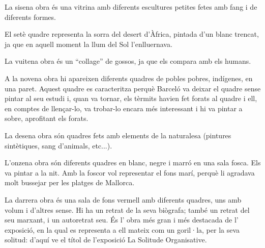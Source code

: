 \begin{news}
La sisena obra és una vitrina amb diferents escultures petites fetes amb fang i de diferents formes.

El setè quadre representa la sorra del desert d’Àfrica, pintada d’un blanc trencat, ja que en aquell moment la llum del Sol l’enlluernava.

La vuitena obra és un “collage” de gossos, ja que els compara amb els humans.

A la novena obra hi apareixen diferents quadres de pobles pobres, indígenes, en una paret. Aquest quadre es caracteritza perquè Barceló va deixar el quadre sense pintar al seu estudi i,  quan va tornar, els tèrmits havien fet forats al quadre i ell, en comptes de llençar-lo, va trobar-lo encara més interessant i hi va pintar a sobre, aprofitant els forats.

La desena obra són quadres fets amb elements de la naturalesa (pintures sintètiques, sang d'animals, etc...).

L’onzena obra són diferents quadres en blanc, negre i marró en una sala fosca. Els va pintar a la nit. Amb la foscor vol representar el fons marí, perquè li agradava molt bussejar per les platges de Mallorca.

La darrera obra és una sala de fons vermell amb diferents quadres, uns amb volum i d’altres sense. Hi ha un retrat de la seva biògrafa; també un retrat del seu marxant, i un autoretrat seu. És l’ obra més gran i més destacada de l’ exposició, en la qual es representa a ell mateix com un goril·la, per la seva solitud: d’aquí ve el títol de l’exposició La Solitude Organisative.

\end{news}
